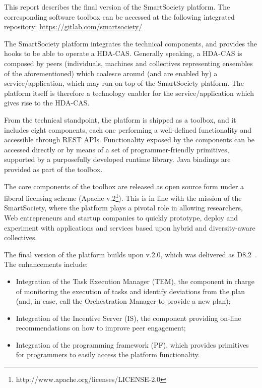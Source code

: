 This report describes the final version of the SmartSociety platform. The corresponding software toolbox can be accessed at the following integrated repository:
\url{https://gitlab.com/smartsociety/}


The SmartSociety platform integrates the technical components, and provides the hooks to be able to operate a HDA-CAS. Generally speaking, a HDA-CAS is composed by peers (individuals, machines and collectives representing ensembles of the aforementioned) which coalesce around (and are enabled by) a service/application, which may run on top of the SmartSociety platform. The platform itself is therefore a technology enabler for the service/application which gives rise to the HDA-CAS. 

From the technical standpoint, the platform is shipped as a toolbox, and it includes eight components, each one performing a well-defined functionality and accessible through REST APIs. Functionality exposed by the components can be accessed directly or by means of a set of programmer-friendly primitives, supported by a purposefully developed runtime library. Java bindings are provided as part of the toolbox. 

The core components of the toolbox are released as open source form under a liberal licensing scheme (Apache v.2\footnote{http://www.apache.org/licenses/LICENSE-2.0}). This is in line with the mission of the SmartSociety, where the platform plays a pivotal role in allowing researchers, Web entrepreneurs and startup companies to quickly prototype, deploy and experiment with applications and services based upon hybrid and diversity-aware collectives.

The final version of the platform builds upon v.2.0, which was delivered as D8.2~\cite{D8.2}. The enhancements include:
\begin{itemize}
\item Integration of the Task Execution Manager (TEM), the component in charge of monitoring the execution of tasks and identify deviations from the plan (and, in case, call the Orchestration Manager to provide a new plan);
\item Integration of the Incentive Server (IS), the component providing on-line recommendations on how to improve peer engagement;
\item Integration of the programming framework (PF), which provides primitives for programmers to easily access the platform functionality.
\end{itemize}


